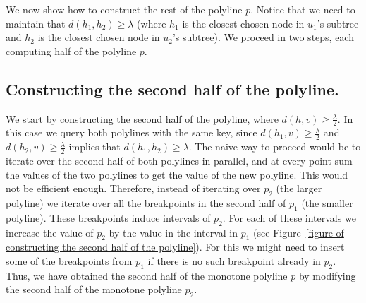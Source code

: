 \documentclass[a4paper,UKenglish]{lipics-v2016}
\theoremstyle{plain}
\begin{document}
We now show how to construct the rest of the polyline $p$. Notice that we need to maintain that $d(h_1,h_2) \geq \lambda$ (where $h_1$ is the closest chosen node in $u_1$'s subtree and $h_2$ is the closest chosen node in $u_2$'s subtree). We proceed in two steps, each computing half of the polyline $p$.

\subsection{Constructing the second half of the polyline.} We start by constructing the second half of the polyline, where $d(h,v) \geq \frac{\lambda}{2}$. In this case we query both polylines with the same key, since $d(h_1,v) \geq \frac{\lambda}{2}$ and $d(h_2,v) \geq \frac{\lambda}{2}$ implies that $d(h_1,h_2) \geq \lambda$. The naive way to proceed would be to iterate over the second half of both polylines in parallel, and at every point sum the values of the two polylines to get the value of the new polyline. This would not be efficient enough. Therefore, instead of iterating over $p_2$ (the larger polyline) we iterate over all the breakpoints in the second half of $p_1$ (the smaller polyline). These breakpoints induce intervals of $p_2$. For each of these intervals we increase the value of $p_{2}$ by the value in the interval in $p_1$ (see Figure~\ref{figure of constructing the second half of the polyline}). For this we might need to insert some of the breakpoints from $p_1$ if there is no such breakpoint already in $p_2$. Thus, we have obtained the second half of the monotone polyline $p$ by modifying the second half of the monotone polyline $p_{2}$.
\end{document}
